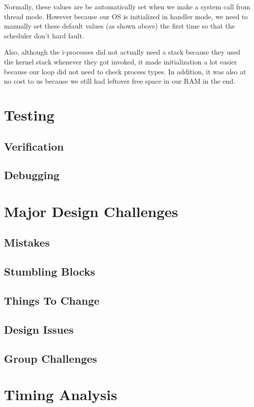 \documentclass[se]{uw-wkrpt}
\begin{document}
\begin{enumerate}
	Normally, these values are be automatically set when we make a system call from thread mode. However because our OS is initialized in handler mode, we need to manually set these default values (as shown above) the first time so that the scheduler don't hard fault. 
	
	Also, although the i-processes did not actually need a stack because they used the kernel stack whenever they got invoked, it made initialization a lot easier because our loop did not need to check process types. In addition, it was also at no cost to us because we still had leftover free space in our RAM in the end. 
	
\end{enumerate}

\section{Testing}\label{sec:test}

\subsection{Verification}

\subsection{Debugging}

\section{Major Design Challenges}\label{sec:design}

\subsection{Mistakes}

\subsection{Stumbling Blocks}

\subsection{Things To Change}

\subsection{Design Issues}

\subsection{Group Challenges}

\section{Timing Analysis}\label{sec:time}
\end{document}
